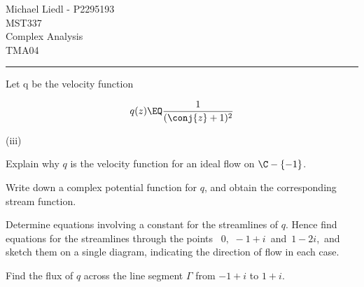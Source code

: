\documentclass[english,a4paper,11pt]{scrartcl}
\begin{document}

	
\begin{center}	
\huge{Michael Liedl - P2295193}\\
\bigskip \bigskip \bigskip
\huge{MST337}\\
\bigskip \bigskip
\huge{Complex Analysis}\\
\bigskip \bigskip \bigskip
\huge{TMA04}\\ 
\bigskip
\end{center}

\comment{
}

\comment{===========================================================}
\noindent\rule[0.5ex]{\linewidth}{1pt} 
\newpage
\begin{Question}{}

 Let q be the velocity function
 
\[ q(z) \EQ \frac{1}{(\conj{z} + 1)^2} \]

\bigskip
\begin{labeling}{(iii) }
  \item [(i)]  Explain why $q$ is the velocity function for an ideal flow on $\C - \{-1\}$. 
  
  \item [(ii)]  Write down a complex potential function for $q$, and obtain the corresponding stream function. 
  
  \item [(iii)]  Determine equations involving a constant for the streamlines of $q$. Hence find equations for the streamlines through the points \, $0, \, \,-1 + i$\, and \,$1 - 2i$,\, and sketch them on a single diagram, indicating the direction of flow in each case. 

  \item [(iv)] Find the flux of $q$ across the line segment $\Gamma$ from $-1 + i$ to $1 + i$. 
  
      
\end{labeling}

\bigskip
\end{Question}

\setcounter{equation}{0}
\end{document}
